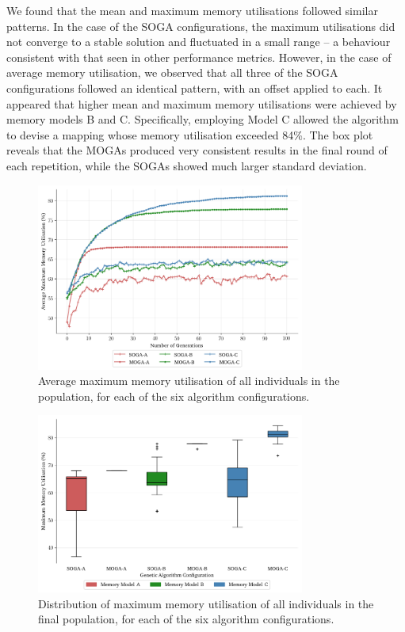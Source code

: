 \documentclass[10pt,conference]{IEEEtran}
\begin{document}
We found that the mean and maximum memory utilisations followed similar patterns. In the case of the SOGA configurations, the maximum utilisations did not converge to a stable solution and fluctuated in a small range -- a behaviour consistent with that seen in other performance metrics. However, in the case of average memory utilisation, we observed that all three of the SOGA configurations followed an identical pattern, with an offset applied to each. It appeared that higher mean and maximum memory utilisations were achieved by memory models B and C. Specifically, employing Model C allowed the algorithm to devise a mapping whose memory utilisation exceeded 84\%. The box plot reveals that the MOGAs produced very consistent results in the final round of each repetition, while the SOGAs showed much larger standard deviation.

\begin{figure}[!ht]
  \centering
  \includegraphics*[width=8.8cm,keepaspectratio]{fig/results-max-memory-utilisation-generations}
\vspace{-5ex}
  \caption{Average maximum memory utilisation of all individuals in the population, for each of the six algorithm configurations.}
  \label{fig:results-max-memory-utilisation-generations}
\vspace{-2.5ex}
\end{figure}

\begin{figure}[!ht]
  \centering
  \includegraphics*[width=8.8cm,keepaspectratio]{fig/results-max-memory-utilisation-boxplot}
\vspace{-4ex}
  \caption{Distribution of maximum memory utilisation of all individuals in the final population, for each of the six algorithm configurations.}
  \label{fig:results-max-memory-utilisation-boxplot}
\vspace{-3ex}
\end{figure}
\end{document}
